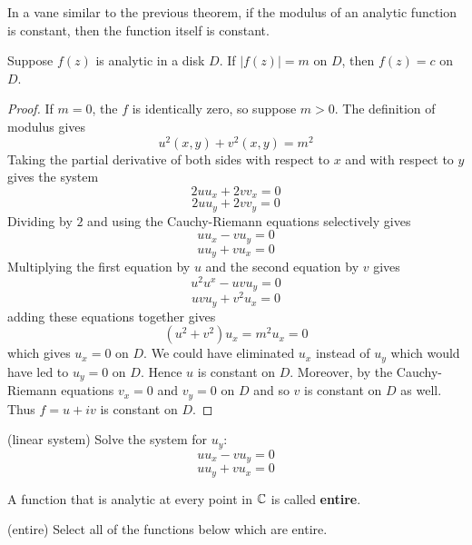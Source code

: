 \documentclass[handout]{ximera}
\begin{document}
In a vane similar to the previous theorem, if the modulus of an analytic function is constant, 
then the function itself is constant.

\begin{theorem}
Suppose $f(z)$ is analytic in a disk $D$. If $|f(z)| = m$ on  $D$, then $f(z) =c$ on $D$.
\end{theorem}

\begin{proof}
If $m =0$, the $f$ is identically zero, so suppose $m>0$. The definition of modulus gives
\[
u^2(x,y) + v^2(x,y) = m^2
\]
Taking the partial derivative of both sides with respect to $x$ and with respect to $y$ gives the system
\[
2uu_x +2vv_x = 0
\]
\[
2uu_y + 2vv_y = 0
\]
Dividing by $2$ and using the Cauchy-Riemann equations selectively gives
\[
uu_x -vu_y = 0
\]
\[
uu_y + vu_x = 0
\]
Multiplying the first equation by $u$ and the second equation by $v$ gives
\[
u^2u^x - uvu_y=0
\]
\[
uvu_y + v^2u_x = 0
\]
adding these equations together gives
\[
\left(u^2 +v^2\right)u_x = m^2u_x = 0
\]
which gives $u_x = 0$ on $D$. We could have eliminated $u_x$ instead of $u_y$ which would 
have led to $u_y =0$ on $D$.
Hence $u$ is constant on $D$. Moreover, by the Cauchy-Riemann equations $v_x=0$ and $v_y=0$ on $D$ and 
so $v$ is constant on $D$ as well.
Thus $f = u+iv$ is constant on $D$.
\end{proof}

\begin{problem}(linear system)
Solve the system for $u_y$:
\[
uu_x -vu_y = 0
\]
\[
uu_y + vu_x = 0
\]
\begin{multipleChoice}
\end{multipleChoice}
\end{problem}


\begin{definition}
A function that is analytic at every point in $\mathbb C$ is called {\bf entire}.
\end{definition}


\begin{problem}(entire)
Select all of the functions below which are entire.
\begin{selectAll}
\end{selectAll}
\end{problem}


\end{document}
